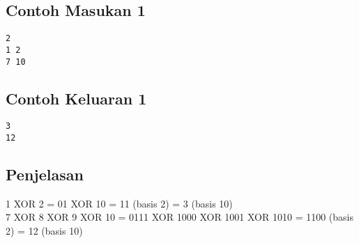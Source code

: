 \documentclass{article}
\begin{document}
\linebreak
\begin{multicols}{2}
\subsection*{Contoh Masukan 1}
\begin{lstlisting}
2
1 2
7 10

\end{lstlisting}
\null
\columnbreak
\subsection*{Contoh Keluaran 1}
\begin{lstlisting}
3
12

\end{lstlisting}
\vfill
\null
\end{multicols}

\subsection*{Penjelasan}
1 XOR 2 = 01 XOR 10 = 11 (basis 2) = 3 (basis 10) \\
7 XOR 8 XOR 9 XOR 10 = 0111 XOR 1000 XOR 1001 XOR 1010 = 1100 (basis 2) = 12 (basis 10) \\
\end{document}
